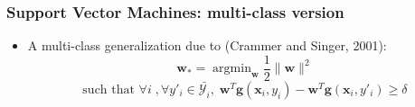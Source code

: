 \documentclass[ignorenonframetext,plain]{beamer}
\DeclareMathOperator*{\argmin}{argmin}
\renewcommand{\vec}{\mathbf}
\begin{document}
\begin{frame}\frametitle{Support Vector Machines: multi-class version}
\begin{itemize}
\item A multi-class generalization due to (Crammer and Singer,
  2001): \[
 \vec{w}_* = \argmin_\vec{w}\frac{1}{2}\|\vec{w}\|^2
\]
\[
\text{such that } \forall i\;, \forall y'_i\in\bar{\mathcal{Y}_i},\; 
\vec{w}^T\vec{g}(\vec{x}_i, y_i) - \vec{w}^T\vec{g}(\vec{x}_i, y'_i)
\geq \delta
\]
\end{itemize}

\end{frame}
\end{document}
